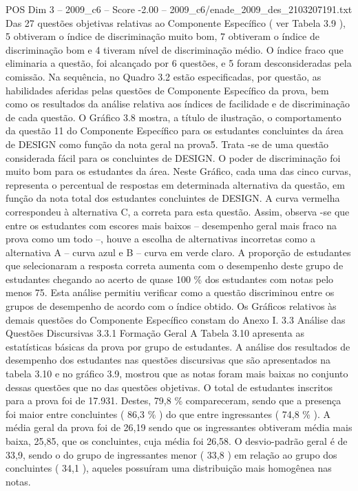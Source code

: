 \begin{textsample}{POS Dim 3 – 2009\_c6 – Score -2.00 – 2009\_c6/enade\_2009\_des\_2103207191.txt}
Das 27 questões objetivas relativas ao Componente Específico ( ver Tabela 3.9 ), 5 obtiveram o índice de discriminação muito bom, 7 obtiveram o índice de discriminação bom e 4 tiveram nível de discriminação médio.
O índice fraco que eliminaria a questão, foi alcançado por 6 questões, e 5 foram desconsideradas pela comissão.
Na sequência, no Quadro 3.2 estão especificadas, por questão, as habilidades aferidas pelas questões de Componente Específico da prova, bem como os resultados da análise relativa aos índices de facilidade e de discriminação de cada questão.
O Gráfico 3.8 mostra, a título de ilustração, o comportamento da questão 11 do Componente Específico para os estudantes concluintes da área de DESIGN como função da nota geral na prova5.
Trata -se de uma questão considerada fácil para os concluintes de DESIGN.
O poder de discriminação foi muito bom para os estudantes da área.
Neste Gráfico, cada uma das cinco curvas, representa o percentual de respostas em determinada alternativa da questão, em função da nota total dos estudantes concluintes de DESIGN.
A curva vermelha correspondeu à alternativa C, a correta para esta questão.
Assim, observa -se que entre os estudantes com escores mais baixos – desempenho geral mais fraco na prova como um todo –, houve a escolha de alternativas incorretas como a alternativa A – curva azul e B – curva em verde claro.
A proporção de estudantes que selecionaram a resposta correta aumenta com o desempenho deste grupo de estudantes chegando ao acerto de quase 100 \% dos estudantes com notas pelo menos 75.
Esta análise permitiu verificar como a questão discriminou entre os grupos de desempenho de acordo com o índice obtido.
Os Gráficos relativos às demais questões do Componente Específico constam do Anexo I. 3.3 Análise das Questões Discursivas 3.3.1 Formação Geral A Tabela 3.10 apresenta as estatísticas básicas da prova por grupo de estudantes.
A análise dos resultados de desempenho dos estudantes nas questões discursivas que são apresentados na tabela 3.10 e no gráfico 3.9, mostrou que as notas foram mais baixas no conjunto dessas questões que no das questões objetivas.
O total de estudantes inscritos para a prova foi de 17.931.
Destes, 79,8 \% compareceram, sendo que a presença foi maior entre concluintes ( 86,3 \% ) do que entre ingressantes ( 74,8 \% ).
A média geral da prova foi de 26,19 sendo que os ingressantes obtiveram média mais baixa, 25,85, que os concluintes, cuja média foi 26,58.
O desvio-padrão geral é de 33,9, sendo o do grupo de ingressantes menor ( 33,8 ) em relação ao grupo dos concluintes ( 34,1 ), aqueles possuíram uma distribuição mais homogênea nas notas.

\end{textsample}
